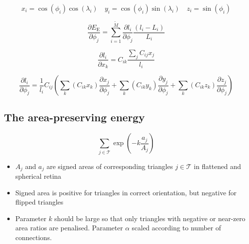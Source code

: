 \documentclass{article}
\begin{document}
\begin{displaymath}
  x_i = \cos(\phi_i)\cos(\lambda_i) \quad 
  y_i = \cos(\phi_i)\sin(\lambda_i) \quad
  z_i = \sin(\phi_i)
\end{displaymath}

\begin{displaymath}
  \frac{\partial E_\mathrm{E}}{\partial \phi_j} 
  = \sum_{i=1}^{\tilde M} \frac{\partial l_i}{\partial \phi_j}
  \frac{(l_i - L_i)}{L_i}  
\end{displaymath}

\begin{displaymath}
  \frac{\partial l_i}{\partial x_k} = C_{ik}\frac{\sum_jC_{ij}x_j}{l_i}
\end{displaymath}

\begin{displaymath}
  \frac{\partial l_i}{\partial \phi_j} = \frac{1}{l_i}
    C_{ij}\left(
      \sum_k(C_{ik}x_k)\frac{\partial x_j}{\partial \phi_j} +
      \sum_k(C_{ik}y_k)\frac{\partial y_j}{\partial \phi_j} +
      \sum_k(C_{ik}z_k)\frac{\partial z_j}{\partial \phi_j} 
    \right)
\end{displaymath}

\subsection{The area-preserving energy}
\label{fold-sphere:sec:area-pres-energy}

\begin{displaymath}
  \sum_{j\in\mathcal{T}} \exp\left(-k\frac{a_j}{A_j}\right)
\end{displaymath}
\begin{itemize}
\item $A_j$ and $a_j$ are signed areas of corresponding triangles
  $j\in\mathcal{T}$ in flattened and spherical retina
\item Signed area is positive for triangles in correct orientation,
  but negative for flipped triangles
\item Parameter $k$ should be large so that only triangles with
  negative or near-zero area ratios are penalised. Parameter $\alpha$
  scaled according to number of connections.
\end{itemize}



\end{document}
